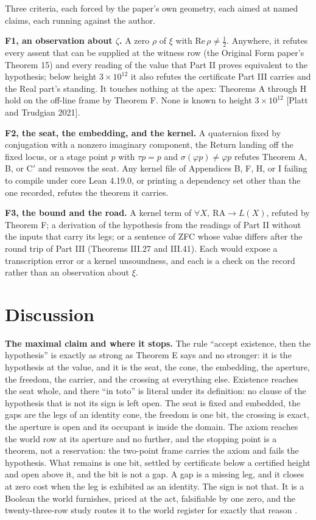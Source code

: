 \documentclass[10pt]{article}
\begin{document}
Three criteria, each forced by the paper's own geometry, each aimed at
named claims, each running against the author.

\textbf{F1, an observation about \(\zeta\).} A zero \(\rho\) of \(\xi\)
with \(\mathrm{Re}\,\rho \neq \tfrac12\). Anywhere, it refutes every
assent that can be supplied at the witness row (the Original Form
paper's Theorem 15) and every reading of the value that Part II proves
equivalent to the hypothesis; below height \(3 \times 10^{12}\) it also
refutes the certificate Part III carries and the Real part's standing.
It touches nothing at the apex: Theorems A through H hold on the
off-line frame by Theorem F. None is known to height
\(3 \times 10^{12}\) {[}Platt and Trudgian 2021{]}.

\textbf{F2, the seat, the embedding, and the kernel.} A quaternion fixed
by conjugation with a nonzero imaginary component, the Return landing
off the fixed locus, or a stage point \(p\) with \(\tau p = p\) and
\(\sigma(\varphi p) \neq \varphi p\) refutes Theorem A, B, or C\('\) and
removes the seat. Any kernel file of Appendices B, F, H, or I failing to
compile under core Lean 4.19.0, or printing a dependency set other than
the one recorded, refutes the theorem it carries.

\textbf{F3, the bound and the road.} A kernel term of
\(\forall X,\ \mathrm{RA} \to L(X)\), refuted by Theorem F; a derivation
of the hypothesis from the readings of Part II without the inputs that
carry its legs; or a sentence of ZFC whose value differs after the round
trip of Part III (Theorems III.27 and III.41). Each would expose a
transcription error or a kernel unsoundness, and each is a check on the
record rather than an observation about \(\xi\).

\hypertarget{discussion}{%
\section{Discussion}\label{discussion}}

\textbf{The maximal claim and where it stops.} The rule ``accept
existence, then the hypothesis'' is exactly as strong as Theorem E says
and no stronger: it is the hypothesis at the value, and it is the seat,
the cone, the embedding, the aperture, the freedom, the carrier, and the
crossing at everything else. Existence reaches the seat whole, and there
``in toto'' is literal under its definition: no clause of the hypothesis
that is not its sign is left open. The seat is fixed and embedded, the
gaps are the legs of an identity cone, the freedom is one bit, the
crossing is exact, the aperture is open and its occupant is inside the
domain. The axiom reaches the world row at its aperture and no further,
and the stopping point is a theorem, not a reservation: the two-point
frame carries the axiom and fails the hypothesis. What remains is one
bit, settled by certificate below a certified height and open above it,
and the bit is not a gap. A gap is a missing leg, and it closes at zero
cost when the leg is exhibited as an identity. The sign is not that. It
is a Boolean the world furnishes, priced at the act, falsifiable by one
zero, and the twenty-three-row study routes it to the world register for
exactly that reason \cite{islamrows}.
\end{document}
